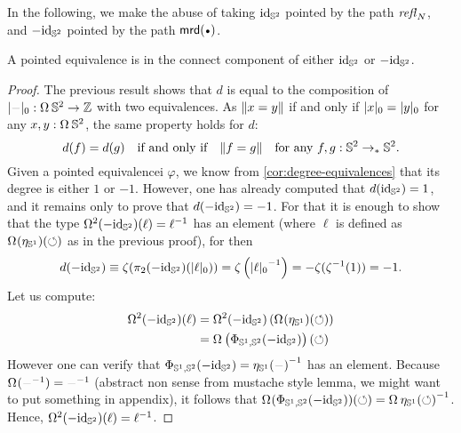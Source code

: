 \documentclass[english,a4]{article}
\newcommand{\ptdto}{\to_\ast}%
\newcommand{\settrunc}[1]{\trunc{#1}_0}
\begin{document}
In the following, we make the abuse of taking $\mathord{\mathrm{id}}_{{\mathbb S^{2}}}$ pointed by the path
$\mathop{{\mathit{refl}}_{N}}$, and $-\mathord{\mathrm{id}}_{{\mathbb S^{2}}}$ pointed by the path $\mrd(\base)$.
\begin{corollary}
  A pointed equivalence is in the connect component of either $\mathord{\mathrm{id}}_{{\mathbb S^{2}}}$ or $-\mathord{\mathrm{id}}_{{\mathbb S^{2}}}$.
  \label{cor:equivalence-conn-component}
\end{corollary}
\begin{proof}
  The previous result shows that $d$ is equal to the composition of
  $\settrunc\blank:\loopspace\null\Sp \to\ZZ$ with two equivalences. As
  $\lVert x = y\rVert$ if and only if $\settrunc x = \settrunc y$ for any
  $x,y:\loopspace\null \Sp$, the same property holds for $d$:
  \begin{displaymath}
    d(f) = d(g) \quad \text{if and only if}\quad
    \Trunc{f = g} \quad \text{for any}\ f,g:\Sp \ptdto\Sp.
  \end{displaymath}
  Given a pointed equivalencei $\varphi$, we know from
  \cref{cor:degree-equivalences} that its degree is either $1$ or $-1$.
  However, one has already computed that $d(\mathord{\mathrm{id}}_{{\mathbb S^{2}}}) = 1$, and it remains only
  to prove that $d(-\mathord{\mathrm{id}}_{{\mathbb S^{2}}}) = -1$. For that it is enough to show that the type
  $\mathop{\Omega^{2}} (-\mathord{\mathrm{id}}_{{\mathbb S^{2}}})(\ell) = {\ell}^{-1}$ has an element (where $\ell$ is
  defined as $\loopspace\null(\eta_\Sc)(\Sloop)$ as in the previous proof), for
  then
  \begin{displaymath}
    d(-\id_\Sp) \jdeq \zeta(\pi_2(-\id_\Sp)(\settrunc{\ell})) = \zeta\left( \inv{\settrunc\ell} \right) = - \zeta(\inv\zeta(1)) = -1.
  \end{displaymath}
  Let us compute:
  \begin{align*}
    \loopspace 2 (-\id_\Sp)(\ell) &= \loopspace 2 (-\id_\Sp) \left( \loopspace\null(\eta_\Sc)(\Sloop) \right)
    \\
    &= \loopspace\null \left( \Phi_{\Sc,\Sp}(-\id_\Sp) \right)(\Sloop)
  \end{align*}
  However one can verify that $\Phi_{\Sc,\Sp}(-\id_\Sp) =
  \inv{\eta_\Sc(\blank)}$ has an element. Because $\loopspace\null(\inv\blank)
  = \inv\blank$ ({\color{red}abstract non sense from mustache style lemma, we
  might want to put something in appendix}), it follows that
  $\loopspace\null(\Phi_{\Sc,\Sp}(-\id_\Sp))(\Sloop) =
  \inv{\loopspace\null\eta_\Sc(\Sloop)}$. Hence, $\mathop{\Omega^{2}} (-\mathord{\mathrm{id}}_{{\mathbb S^{2}}})(\ell)
  = {\ell}^{-1}$.
\end{proof}
\end{document}
